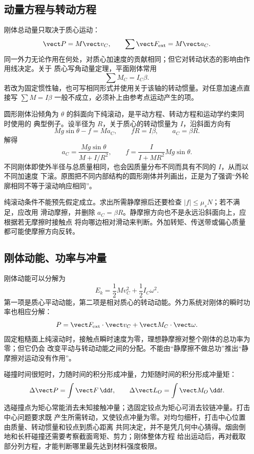 \subsection*{动量方程与转动方程}

刚体总动量只取决于质心运动：
\[
  \vect P=M\vect v_C,
  \qquad
  \sum\vect F_{\rm ext}=M\vect a_C.
\]
同一外力无论作用在何处，对质心加速度的贡献相同；但它对转动状态的影响由作用线决定。关于
质心写角动量定理，平面刚体常用
\[
  \sum M_C=I_C\beta.
\]
若改为固定惯性轴，也可写相同形式并使用关于该轴的转动惯量。对任意加速点直接写
$\sum M=I\beta$ 一般不成立，必须补上由参考点运动产生的项。

圆形刚体沿倾角为 $\theta$ 的斜面向下纯滚动，是平动方程、转动方程和运动学约束同时使用的
典型例子。设半径为 $R$，关于质心的转动惯量为 $I$，沿斜面方向有
\[
  Mg\sin\theta-f=Ma_C,
  \qquad fR=I\beta,
  \qquad a_C=\beta R.
\]
解得
\[
  a_C=\frac{Mg\sin\theta}{M+I/R^2},
  \qquad
  f=\frac{I}{I+MR^2}Mg\sin\theta.
\]
不同刚体即使外半径与总质量相同，也会因质量分布不同而具有不同的 $I$，从而以不同加速度
下滚。原图把不同内部结构的圆形刚体并列画出，正是为了强调“外轮廓相同不等于滚动响应相同”。

纯滚动条件不能预先假定成立。求出所需静摩擦后还要检查 $|f|\le\mu_sN$；若不满足，应改用
滑动摩擦，并删除 $a_C=\beta R$。静摩擦方向也不是永远沿斜面向上，应根据若无摩擦时接触点
将向哪边相对滑动来判断。外加转矩、传送带或偏心质量都可能使摩擦方向反转。

\subsection*{刚体动能、功率与冲量}

刚体动能可以分解为
\[
  E_k=\frac12Mv_C^2+\frac12I_C\omega^2.
\]
第一项是质心平动动能，第二项是相对质心的转动动能。外力系统对刚体的瞬时功率也相应分解：
\[
  P=\vect F_{\rm ext}\cdot\vect v_C+\vect M_C\cdot\vect\omega.
\]
固定粗糙面上纯滚动时，接触点瞬时速度为零，理想静摩擦对整个刚体的总功率为零；但它仍会
改变平动与转动动能之间的分配。不能由“静摩擦不做总功”推出“静摩擦对运动没有作用”。

碰撞时间很短时，力随时间的积分形成冲量，力矩随时间的积分形成冲量矩：
\[
  \Delta\vect P=\int\vect F\,\dd t,
  \qquad
  \Delta\vect L_O=\int\vect M_O\,\dd t.
\]
选碰撞点为矩心常能消去未知接触冲量；选固定铰点为矩心可消去铰链冲量。打击中心问题要求既
产生所需转动，又使铰点冲量为零。对均匀细杆，打击中心位置由质量、转动惯量和铰点到质心距离
共同决定，并不是凭几何中心猜得。烟囱倒地和长杆碰撞还需要考察截面弯矩、剪力；刚体整体方程
给出运动后，再对截取部分列方程，才能判断哪里最先达到材料强度极限。

